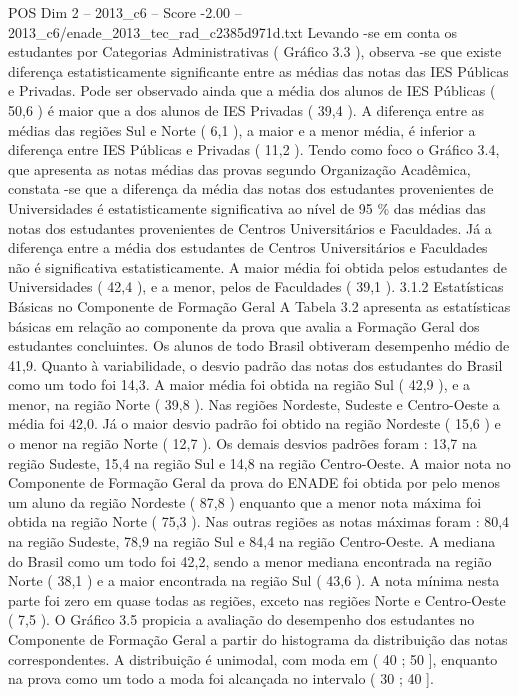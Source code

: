 \begin{textsample}{POS Dim 2 – 2013\_c6 – Score -2.00 – 2013\_c6/enade\_2013\_tec\_rad\_c2385d971d.txt}
Levando -se em conta os estudantes por Categorias Administrativas ( Gráfico 3.3 ), observa -se que existe diferença estatisticamente significante entre as médias das notas das IES Públicas e Privadas.
Pode ser observado ainda que a média dos alunos de IES Públicas ( 50,6 ) é maior que a dos alunos de IES Privadas ( 39,4 ).
A diferença entre as médias das regiões Sul e Norte ( 6,1 ), a maior e a menor média, é inferior a diferença entre IES Públicas e Privadas ( 11,2 ).
Tendo como foco o Gráfico 3.4, que apresenta as notas médias das provas segundo Organização Acadêmica, constata -se que a diferença da média das notas dos estudantes provenientes de Universidades é estatisticamente significativa ao nível de 95 \% das médias das notas dos estudantes provenientes de Centros Universitários e Faculdades.
Já a diferença entre a média dos estudantes de Centros Universitários e Faculdades não é significativa estatisticamente.
A maior média foi obtida pelos estudantes de Universidades ( 42,4 ), e a menor, pelos de Faculdades ( 39,1 ). 3.1.2 Estatísticas Básicas no Componente de Formação Geral A Tabela 3.2 apresenta as estatísticas básicas em relação ao componente da prova que avalia a Formação Geral dos estudantes concluintes.
Os alunos de todo Brasil obtiveram desempenho médio de 41,9.
Quanto à variabilidade, o desvio padrão das notas dos estudantes do Brasil como um todo foi 14,3.
A maior média foi obtida na região Sul ( 42,9 ), e a menor, na região Norte ( 39,8 ).
Nas regiões Nordeste, Sudeste e Centro-Oeste a média foi 42,0.
Já o maior desvio padrão foi obtido na região Nordeste ( 15,6 ) e o menor na região Norte ( 12,7 ).
Os demais desvios padrões foram : 13,7 na região Sudeste, 15,4 na região Sul e 14,8 na região Centro-Oeste.
A maior nota no Componente de Formação Geral da prova do ENADE foi obtida por pelo menos um aluno da região Nordeste ( 87,8 ) enquanto que a menor nota máxima foi obtida na região Norte ( 75,3 ).
Nas outras regiões as notas máximas foram : 80,4 na região Sudeste, 78,9 na região Sul e 84,4 na região Centro-Oeste.
A mediana do Brasil como um todo foi 42,2, sendo a menor mediana encontrada na região Norte ( 38,1 ) e a maior encontrada na região Sul ( 43,6 ).
A nota mínima nesta parte foi zero em quase todas as regiões, exceto nas regiões Norte e Centro-Oeste ( 7,5 ).
O Gráfico 3.5 propicia a avaliação do desempenho dos estudantes no Componente de Formação Geral a partir do histograma da distribuição das notas correspondentes.
A distribuição é unimodal, com moda em ( 40 ; 50 ], enquanto na prova como um todo a moda foi alcançada no intervalo ( 30 ; 40 ].

\end{textsample}
